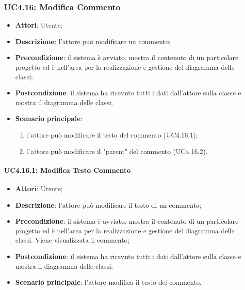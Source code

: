 \subsubsection{UC4.16: Modifica Commento}
\label{UC4.16}
\begin{itemize}
	\item \textbf{Attori}: Utente;
	\item \textbf{Descrizione}: l'attore può modificare un commento;
	\item \textbf{Precondizione}: il sistema è avviato, mostra il contenuto di un particolare progetto ed è nell'area per la realizzazione e gestione del diagramma delle classi;
	\item \textbf{Postcondizione}: il sistema ha ricevuto tutti i dati dall'attore sulla classe e mostra il diagramma delle classi;
	\item \textbf{Scenario principale}:
	\begin{enumerate}
		\item l'attore può modificare il testo del commento (UC4.16.1);
		\item l'attore può modificare il "parent" del commento (UC4.16.2).
	\end{enumerate}
\end{itemize}

\paragraph{UC4.16.1: Modifica Testo Commento}
\label{UC4.16.1}
\begin{itemize}
	\item \textbf{Attori}: Utente;
	\item \textbf{Descrizione}: l'attore può modificare il testo di un commento;
	\item \textbf{Precondizione}: il sistema è avviato, mostra il contenuto di un particolare progetto ed è nell'area per la realizzazione e gestione del diagramma delle classi. Viene visualizzata il commento;
	\item \textbf{Postcondizione}: il sistema ha ricevuto tutti i dati dall'attore sulla classe e mostra il diagramma delle classi;
	\item \textbf{Scenario principale}: l'attore modifica il testo del commento.
\end{itemize}

